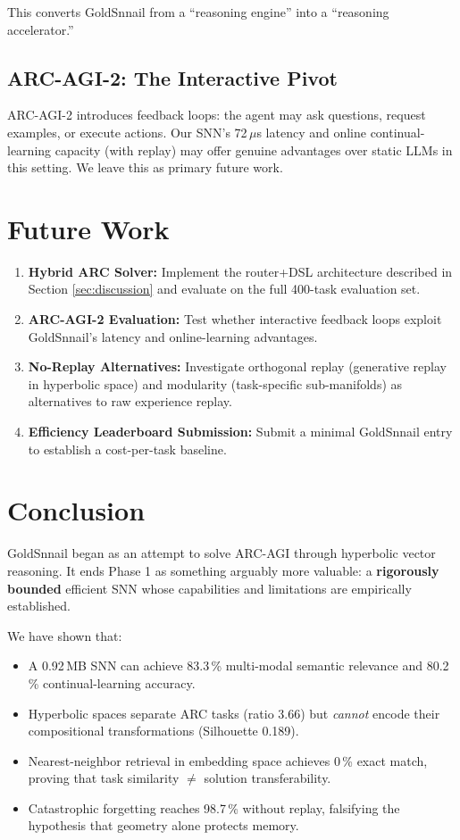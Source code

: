 \documentclass[11pt,a4paper]{article}
\begin{document}
This converts GoldSnnail from a ``reasoning engine'' into a ``reasoning accelerator.''

\subsection{ARC-AGI-2: The Interactive Pivot}

ARC-AGI-2 introduces feedback loops: the agent may ask questions, request examples, or execute actions. Our SNN's 72\,$\mu$s latency and online continual-learning capacity (with replay) may offer genuine advantages over static LLMs in this setting. We leave this as primary future work.

\section{Future Work}
\label{sec:future}

\begin{enumerate}
    \item \textbf{Hybrid ARC Solver:} Implement the router+DSL architecture described in Section \ref{sec:discussion} and evaluate on the full 400-task evaluation set.
    \item \textbf{ARC-AGI-2 Evaluation:} Test whether interactive feedback loops exploit GoldSnnail's latency and online-learning advantages.
    \item \textbf{No-Replay Alternatives:} Investigate orthogonal replay (generative replay in hyperbolic space) and modularity (task-specific sub-manifolds) as alternatives to raw experience replay.
    \item \textbf{Efficiency Leaderboard Submission:} Submit a minimal GoldSnnail entry to establish a cost-per-task baseline.
\end{enumerate}

\section{Conclusion}
\label{sec:conclusion}

GoldSnnail began as an attempt to solve ARC-AGI through hyperbolic vector reasoning. It ends Phase 1 as something arguably more valuable: a \textbf{rigorously bounded} efficient SNN whose capabilities and limitations are empirically established.

We have shown that:
\begin{itemize}
    \item A 0.92\,MB SNN can achieve 83.3\,\% multi-modal semantic relevance and 80.2\,\% continual-learning accuracy.
    \item Hyperbolic spaces separate ARC tasks (ratio 3.66) but \emph{cannot} encode their compositional transformations (Silhouette 0.189).
    \item Nearest-neighbor retrieval in embedding space achieves 0\,\% exact match, proving that task similarity $\neq$ solution transferability.
    \item Catastrophic forgetting reaches 98.7\,\% without replay, falsifying the hypothesis that geometry alone protects memory.
\end{itemize}
\end{document}
